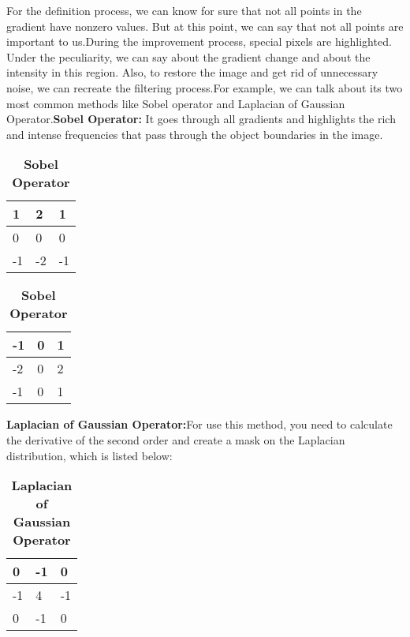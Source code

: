 \vspace{-0.5cm}
\noindent For the definition process, we can know for sure that not all points in the gradient have nonzero values. But at this point, we can say that not all points are important to us.During the improvement process, special pixels are highlighted. Under the peculiarity, we can say about the gradient change and about the intensity in this region. Also, to restore the image and get rid of unnecessary noise, we can recreate the filtering process.For example, we can talk about its two most common methods like Sobel operator and Laplacian of Gaussian Operator.\textbf{Sobel Operator:}
It goes through all gradients and highlights the rich and intense frequencies that pass through the object boundaries in the image.
\begin{table}[!htb]
	\caption{\textbf{Sobel Operator}}
	\begin{minipage}{.5\linewidth}
		\centering
		\begin{tabular}{|l|l|l|} \hline
			1 & 2 & 1 \\ \hline
			0 & 0 & 0 \\ \hline
			-1 & -2 & -1 \\ \hline
		\end{tabular}
	\end{minipage}%
	\begin{minipage}{.5\linewidth}
		\centering
		\begin{tabular}{|l|l|l|} \hline
			-1 & 0 & 1 \\ \hline
			-2 & 0 & 2 \\ \hline
			-1 & 0 & 1 \\ \hline
		\end{tabular}
	\end{minipage} 
\end{table}

\textbf{Laplacian of Gaussian Operator:}For use this method, you need to calculate the derivative of the second order and create a mask on the Laplacian distribution, which is listed below:
\begin{table}[!htb]
	\caption{\textbf{Laplacian of Gaussian Operator}}
	\centering
	\vspace{0.3cm}
	\begin{tabular}{|l|l|l|} \hline
		0 & -1 & 0 \\ \hline
		-1 & 4 & -1 \\ \hline
		0 & -1 & 0 \\ \hline
	\end{tabular} 
\end{table}

